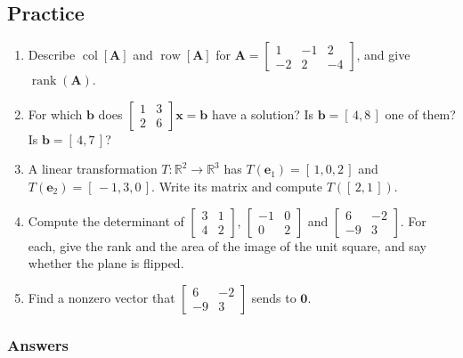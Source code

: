 \documentclass[11pt]{article}
\theoremstyle{plain}
\theoremstyle{definition}
\theoremstyle{remark}
\newcommand{\R}{\mathbb{R}}
\newcommand{\vc}[1]{\mathbf{#1}}        %
\newcommand{\mt}[1]{\mathbf{#1}}        %
\newcommand{\colsp}[1]{\operatorname{col}[#1]}
\newcommand{\rowsp}[1]{\operatorname{row}[#1]}
\DeclareMathOperator{\rank}{rank}
\begin{document}
\subsection{Practice}
\begin{enumerate}[label=\textbf{P\arabic*.},leftmargin=2.6em,itemsep=5pt]
  \item Describe $\colsp{\mt{A}}$ and $\rowsp{\mt{A}}$ for
        $\mt{A}=\begin{bmatrix}1&-1&2\\-2&2&-4\end{bmatrix}$, and give
        $\rank(\mt{A})$.
  \item For which $\vc{b}$ does
        $\begin{bmatrix}1&3\\2&6\end{bmatrix}\vc{x}=\vc{b}$ have a solution?
        Is $\vc{b}=[\,4,8\,]$ one of them? Is $\vc{b}=[\,4,7\,]$?
  \item A linear transformation $T:\R^{2}\to\R^{3}$ has
        $T(\vc{e}_1)=[\,1,0,2\,]$ and $T(\vc{e}_2)=[\,-1,3,0\,]$. Write its
        matrix and compute $T([\,2,1\,])$.
  \item Compute the determinant of
        $\begin{bmatrix}3&1\\4&2\end{bmatrix}$,
        $\begin{bmatrix}-1&0\\0&2\end{bmatrix}$ and
        $\begin{bmatrix}6&-2\\-9&3\end{bmatrix}$. For each, give the rank and
        the area of the image of the unit square, and say whether the plane is
        flipped.
  \item Find a nonzero vector that
        $\begin{bmatrix}6&-2\\-9&3\end{bmatrix}$ sends to $\vc{0}$.
\end{enumerate}

\subsubsection*{Answers}
\end{document}
